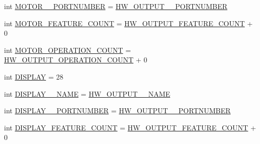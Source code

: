 \begin{DoxyCompactItemize}
\item 
int \hyperlink{interfaceshootingmachineemfmodel_1_1_shootingmachineemfmodel_package_ad27731e242f79b59628ab647963d0eaf}{M\-O\-T\-O\-R\-\_\-\-\_\-\-P\-O\-R\-T\-N\-U\-M\-B\-E\-R} = \hyperlink{interfaceshootingmachineemfmodel_1_1_shootingmachineemfmodel_package_a2407c3a47af8c06cbb4aabb70268949d}{H\-W\-\_\-\-O\-U\-T\-P\-U\-T\-\_\-\-\_\-\-P\-O\-R\-T\-N\-U\-M\-B\-E\-R}
\item 
int \hyperlink{interfaceshootingmachineemfmodel_1_1_shootingmachineemfmodel_package_ad99b3e06abce5503e6e3ef77c5058b72}{M\-O\-T\-O\-R\-\_\-\-F\-E\-A\-T\-U\-R\-E\-\_\-\-C\-O\-U\-N\-T} = \hyperlink{interfaceshootingmachineemfmodel_1_1_shootingmachineemfmodel_package_aefdcd2b83d8884b60a471a861146421f}{H\-W\-\_\-\-O\-U\-T\-P\-U\-T\-\_\-\-F\-E\-A\-T\-U\-R\-E\-\_\-\-C\-O\-U\-N\-T} + 0
\item 
int \hyperlink{interfaceshootingmachineemfmodel_1_1_shootingmachineemfmodel_package_ace2679b1f358734d8936489db75b5a35}{M\-O\-T\-O\-R\-\_\-\-O\-P\-E\-R\-A\-T\-I\-O\-N\-\_\-\-C\-O\-U\-N\-T} = \hyperlink{interfaceshootingmachineemfmodel_1_1_shootingmachineemfmodel_package_a911c6904fe8043130ce479d0e1d2e0b6}{H\-W\-\_\-\-O\-U\-T\-P\-U\-T\-\_\-\-O\-P\-E\-R\-A\-T\-I\-O\-N\-\_\-\-C\-O\-U\-N\-T} + 0
\item 
int \hyperlink{interfaceshootingmachineemfmodel_1_1_shootingmachineemfmodel_package_a5192d9d2f65949d1265252867e80bb70}{D\-I\-S\-P\-L\-A\-Y} = 28
\item 
int \hyperlink{interfaceshootingmachineemfmodel_1_1_shootingmachineemfmodel_package_a285c9b72184c985918ffefe121eabcd9}{D\-I\-S\-P\-L\-A\-Y\-\_\-\-\_\-\-N\-A\-M\-E} = \hyperlink{interfaceshootingmachineemfmodel_1_1_shootingmachineemfmodel_package_a82c44c284e4ef61163abe3704089bfad}{H\-W\-\_\-\-O\-U\-T\-P\-U\-T\-\_\-\-\_\-\-N\-A\-M\-E}
\item 
int \hyperlink{interfaceshootingmachineemfmodel_1_1_shootingmachineemfmodel_package_a46895963de9d19faad3fa3c2f0e20e5d}{D\-I\-S\-P\-L\-A\-Y\-\_\-\-\_\-\-P\-O\-R\-T\-N\-U\-M\-B\-E\-R} = \hyperlink{interfaceshootingmachineemfmodel_1_1_shootingmachineemfmodel_package_a2407c3a47af8c06cbb4aabb70268949d}{H\-W\-\_\-\-O\-U\-T\-P\-U\-T\-\_\-\-\_\-\-P\-O\-R\-T\-N\-U\-M\-B\-E\-R}
\item 
int \hyperlink{interfaceshootingmachineemfmodel_1_1_shootingmachineemfmodel_package_a76c970461ac665b36f359adb602c1802}{D\-I\-S\-P\-L\-A\-Y\-\_\-\-F\-E\-A\-T\-U\-R\-E\-\_\-\-C\-O\-U\-N\-T} = \hyperlink{interfaceshootingmachineemfmodel_1_1_shootingmachineemfmodel_package_aefdcd2b83d8884b60a471a861146421f}{H\-W\-\_\-\-O\-U\-T\-P\-U\-T\-\_\-\-F\-E\-A\-T\-U\-R\-E\-\_\-\-C\-O\-U\-N\-T} + 0

\end{DoxyCompactItemize}
